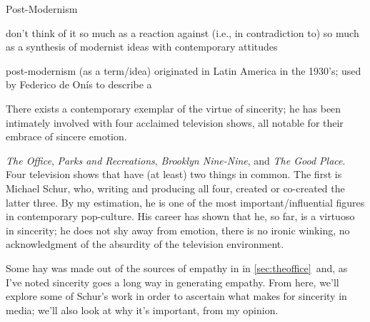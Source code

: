 \documentclass[../butidigress.tex]{subfiles}
\begin{document}
\begin{somenotes}{Post-Modernism}
    \item don't think of it so much as a reaction against (i.e., in contradiction to) so much as a synthesis of modernist ideas with contemporary attitudes
    \item post-modernism (as a term/idea) originated in Latin America in the 1930's; used by Federico de Onís to describe a \autocite[4]{originspostmodernity}
\end{somenotes}



\entryskip

There exists a contemporary exemplar of the virtue of sincerity; he has been intimately involved with four acclaimed television shows, all notable for their embrace of sincere emotion.

\textit{The Office}, \textit{Parks and Recreations}, \textit{Brooklyn Nine-Nine}, and \textit{The Good Place}.
Four television shows that have (at least) two things in common.
The first is Michael Schur, who, writing and producing all four, created or co-created the latter three.
By my estimation, he is one of the most important/influential figures in contemporary pop-culture.
His career has shown that he, so far, is a virtuoso in sincerity; he does not shy away from emotion, there is no ironic winking, no acknowledgment of the absurdity of the television environment.

Some hay was made out of the sources of empathy in  in \ref{sec:theoffice}\ and, as I've noted sincerity goes a long way in generating empathy.
From here, we'll explore some of Schur's work in order to ascertain what makes for sincerity in media; we'll also look at why it's important, from my opinion.
\end{document}
